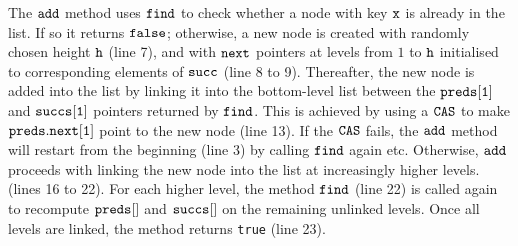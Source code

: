The $\tt add$ method uses $\tt find$ to check whether a node with key $\tt x$ is already in the list. If so it returns $\tt false$; otherwise, a new node is created with randomly chosen height $\tt h$ (line 7), and with $\tt next$ pointers at levels from $1$ to $\tt h$  initialised to corresponding elements of $\tt succ$ (line 8 to 9). Thereafter, the new node is added into the list by linking it into the bottom-level list between the $\tt preds[1]$ and $\tt succs[1]$ pointers returned by $\tt find$. This is achieved by using a $\tt CAS$ to make $\tt preds.next[1]$ point to the new node (line 13). If the $\tt CAS$ fails, the $\tt add$ method will restart from the beginning (line 3) by calling $\tt find$ again etc. Otherwise, $\tt add$ proceeds with linking the new node into the list at increasingly higher levels. (lines 16 to 22). For each higher level, the method $\tt find$ (line 22) is called again to recompute $\tt preds[]$ and $\tt succs[]$ on the remaining unlinked levels. Once all levels are linked, the method returns {\tt true} (line 23).

 


